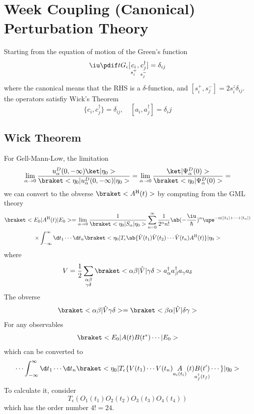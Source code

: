 
\chapter{Week Coupling (Canonical) Perturbation Theory}

Starting from the equation of motion of the Green's function
\begin{equation}
  \iu\pdif t G_\epsilon [\underset{s_i^+}{c_i}, \underset{s_j^-}{c_j^\dagger}]
= \delta_{ij}
\end{equation}
where the canonical means that the RHS is a $\delta$-function,
and $[s_i^+, s_j^-] = 2s_i^z\delta_{ij}$.
the operators satisfiy Wick's Theorem
\[
  \{c_i, c_j^\dagger\} = \delta_{ij}, \quad [a_i, a_j^\dagger] = \delta_ij
\]

\section{Wick Theorem}

For Gell-Mann-Low, the limitation
\[
  \lim_{\alpha\to0} \frac{u_\alpha^D(0,-\infty)\ket|\eta_0>}
    {\braket<\eta_0|u_\alpha^D(0,-\infty)|\eta_0>}
= \lim_{\alpha\to0} \frac{\ket|\Psi_\alpha^D(0)>}
    {\braket<\eta_0|\Psi_\alpha^D(0)>}
=
\]
we can convert to the obverse $\braket<A^\text H(t)>$ by computing from the
GML theory
\begin{multline}
  \braket<E_0|A^\text H(t)|E_0>
= \lim_{\alpha\to0} \frac1{\braket<\eta_0|S_\alpha|\eta_0>}
  \sum_{n=0}^\infty \frac1{2^nn!}
  \ab(-\frac\iu\hbar)^n \upe^{-\alpha(|t_1|+\cdots+|t_n|)} \\ \times
  \int_{-\infty}^\infty \d t_1 \cdots \d t_n
  \braket<\eta_0|T_\epsilon
  \ab\{\hat V(t_1)\hat V(t_2) \cdots \hat V(t_n) A^\text H(t)\}|\eta_0>
\end{multline}
where
\[
  V = \frac12 \sum_{\substack{\alpha\beta\\\gamma\delta}}
    \braket<\alpha\beta|\hat V|\gamma\delta>
    a_\alpha^\dagger a_\beta^\dagger a_\gamma a_\delta
\]
The obverse
\[
  \braket<\alpha\beta|\hat V\gamma\delta>
= \braket<\beta\alpha|\hat V|\delta\gamma>
\]
For any observables
\[
  \braket<E_0|A(t) B(t^*) \cdots |E_0>
\]
which can be converted to
\[
  \cdots \int_{-\infty}^\infty \d t_1 \cdots \d t_n
  \braket<\eta_0|
  T_\epsilon\{V(t_1) \cdots V(t_n)
    \underset{a_i(t_i)}A(t) \underset{a_f^\dagger(t_f)}{B(t')} \cdots\}|\eta_0>
\]
To calculate it, consider
\[
  T_\epsilon(O_1(t_1)O_2(t_2)O_3(t_3)O_4(t_4))
\]
which has the order number $4! = 24$.

